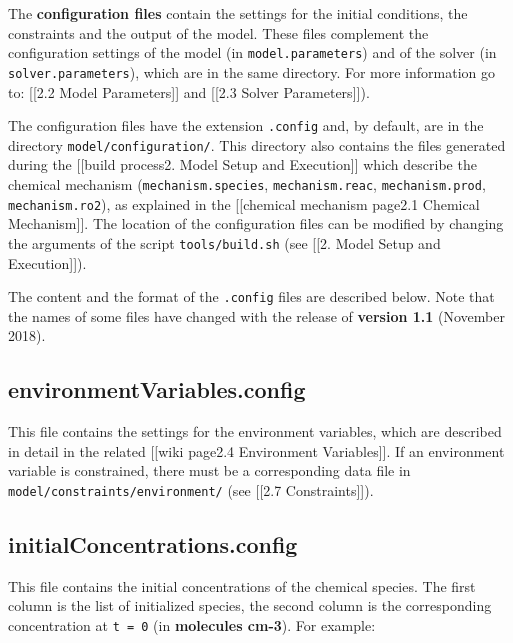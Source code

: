 The \textbf{configuration files} contain the settings for the initial
conditions, the constraints and the output of the model. These files
complement the configuration settings of the model (in
\texttt{model.parameters}) and of the solver (in
\texttt{solver.parameters}), which are in the same directory. For more
information go to: {[}{[}2.2 Model Parameters{]}{]} and {[}{[}2.3 Solver
Parameters{]}{]}).

The configuration files have the extension \texttt{.config} and, by
default, are in the directory \texttt{model/configuration/}. This
directory also contains the files generated during the {[}{[}build
process\textbar{}2. Model Setup and Execution{]}{]} which describe the
chemical mechanism (\texttt{mechanism.species}, \texttt{mechanism.reac},
\texttt{mechanism.prod}, \texttt{mechanism.ro2}), as explained in the
{[}{[}chemical mechanism page\textbar{}2.1 Chemical Mechanism{]}{]}. The
location of the configuration files can be modified by changing the
arguments of the script \texttt{tools/build.sh} (see {[}{[}2. Model
Setup and Execution{]}{]}).

The content and the format of the \texttt{.config} files are described
below. Note that the names of some files have changed with the release
of \textbf{version 1.1} (November 2018).

\hypertarget{environmentvariables.config}{%
\subsection{environmentVariables.config}\label{environmentvariables.config}}

This file contains the settings for the environment variables, which are
described in detail in the related {[}{[}wiki page\textbar{}2.4
Environment Variables{]}{]}. If an environment variable is constrained,
there must be a corresponding data file in
\texttt{model/constraints/environment/} (see {[}{[}2.7
Constraints{]}{]}).

\hypertarget{initialconcentrations.config}{%
\subsection{initialConcentrations.config}\label{initialconcentrations.config}}

This file contains the initial concentrations of the chemical species.
The first column is the list of initialized species, the second column
is the corresponding concentration at \texttt{t\ =\ 0} (in
\textbf{molecules cm-3}). For example:

